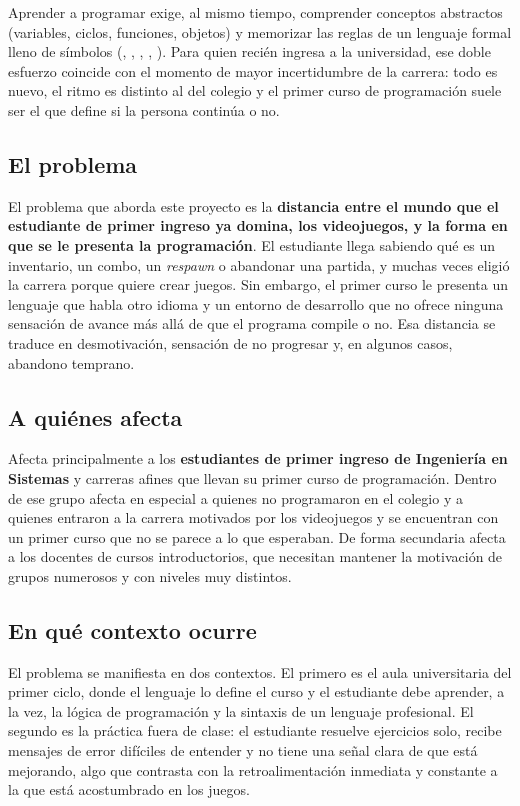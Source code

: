 Aprender a programar exige, al mismo tiempo, comprender conceptos abstractos (variables, ciclos, funciones, objetos) y memorizar las reglas de un lenguaje formal lleno de símbolos (\kw{\{ \}}, \kw{;}, \kw{\&\&}, \kw{!=}, \kw{++}). Para quien recién ingresa a la universidad, ese doble esfuerzo coincide con el momento de mayor incertidumbre de la carrera: todo es nuevo, el ritmo es distinto al del colegio y el primer curso de programación suele ser el que define si la persona continúa o no.

\subsection*{El problema}

El problema que aborda este proyecto es la \textbf{distancia entre el mundo que el estudiante de primer ingreso ya domina, los videojuegos, y la forma en que se le presenta la programación}. El estudiante llega sabiendo qué es un inventario, un combo, un \emph{respawn} o abandonar una partida, y muchas veces eligió la carrera porque quiere crear juegos. Sin embargo, el primer curso le presenta un lenguaje que habla otro idioma y un entorno de desarrollo que no ofrece ninguna sensación de avance más allá de que el programa compile o no. Esa distancia se traduce en desmotivación, sensación de no progresar y, en algunos casos, abandono temprano.

\subsection*{A quiénes afecta}

Afecta principalmente a los \textbf{estudiantes de primer ingreso de Ingeniería en Sistemas} y carreras afines que llevan su primer curso de programación. Dentro de ese grupo afecta en especial a quienes no programaron en el colegio y a quienes entraron a la carrera motivados por los videojuegos y se encuentran con un primer curso que no se parece a lo que esperaban. De forma secundaria afecta a los docentes de cursos introductorios, que necesitan mantener la motivación de grupos numerosos y con niveles muy distintos.

\subsection*{En qué contexto ocurre}

El problema se manifiesta en dos contextos. El primero es el aula universitaria del primer ciclo, donde el lenguaje lo define el curso y el estudiante debe aprender, a la vez, la lógica de programación y la sintaxis de un lenguaje profesional. El segundo es la práctica fuera de clase: el estudiante resuelve ejercicios solo, recibe mensajes de error difíciles de entender y no tiene una señal clara de que está mejorando, algo que contrasta con la retroalimentación inmediata y constante a la que está acostumbrado en los juegos.

